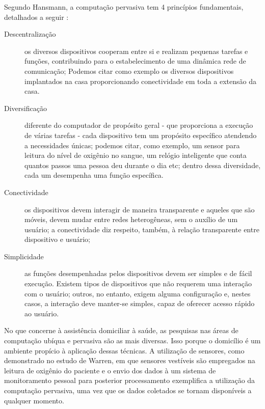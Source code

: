 
Segundo Hansmann, a computação pervasiva tem 4 princípios fundamentais,
detalhados a seguir \cite{hansmann2013pervasive}:

\begin{description}
  \item [Descentralização] os diversos dispositivos cooperam entre si e realizam
  pequenas tarefas e funções, contribuindo para o estabelecimento de uma 
  dinâmica rede de comunicação; Podemos citar como exemplo os diversos 
  dispositivos implantados na casa proporcionando conectividade em toda
  a extensão da casa.
  \item [Diversificação] diferente do computador de propósito geral - que 
  proporciona a execução de várias tarefas - cada dispositivo tem um propósito
  específico atendendo a necessidades únicas; podemos citar, como exemplo, um
  sensor para leitura do nível de oxigênio no sangue, um relógio inteligente
  que conta quantos passos uma pessoa deu durante o dia etc; dentro dessa 
  diversidade, cada um desempenha uma função específica.
  \item [Conectividade] os dispositivos devem interagir de maneira transparente
  e aqueles que são móveis, devem mudar entre redes heterogêneas, sem o 
  auxílio de um usuário; a conectividade diz respeito, também, à relação 
  transparente entre dispositivo e usuário; 
  \item [Simplicidade] as funções desempenhadas pelos dispositivos devem ser
  simples e de fácil execução. Existem tipos de dispositivos que não requerem 
  uma interação com o usuário; outros, no entanto, exigem alguma configuração e,
  nestes casos, a interação deve manter-se simples, capaz de oferecer acesso
  rápido ao usuário. 
\end{description}

No que concerne à assistência domiciliar à saúde, as pesquisas nas áreas de
computação ubíqua e pervasiva são as mais diversas. Isso porque o domicílio é um
ambiente propício à aplicação dessas técnicas. A utilização de sensores, como
demonstrado no estudo de Warren, em que sensores  vestíveis são empregados na
leitura de oxigênio do paciente e o envio dos dados à um sistema de
monitoramento pessoal para posterior processamento \cite{warren2002sensors}
exemplifica a utilização da computação pervasiva, uma  vez que os dados
coletados se tornam disponíveis a qualquer momento.

